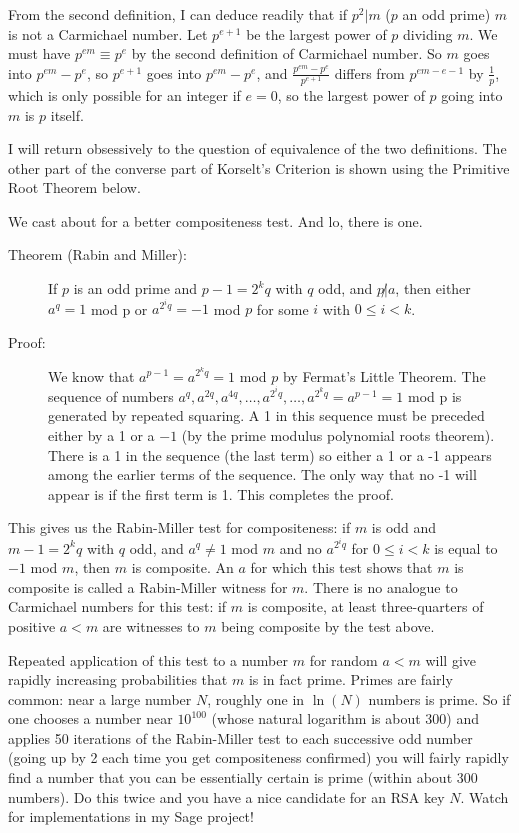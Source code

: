 \documentclass[12pt]{article}
\begin{document}
From the second definition, I can deduce readily that if $p^2 | m$ ($p$ an odd prime) $m$ is not a Carmichael number.   Let $p^{e+1}$ be the largest power of $p$ dividing $m$.   We must have $p^{em} \equiv p^e$ by the
second definition of Carmichael number.  So $m$ goes into $p^{em}-p^e$, so $p^{e+1}$ goes into  $p^{em}-p^e$, and $\frac{p^{em}-p^e} {p^{e+1}}$ differs from $p^{em-e-1}$ by $\frac 1 p$, which is only possible for an 
integer if $e=0$, so the largest power of $p$ going into $m$ is $p$ itself.

I will return obsessively to the question of equivalence of the two definitions.   The other part of the converse part of Korselt's Criterion is shown using the Primitive Root Theorem below.

We cast about for a better compositeness test.  And lo, there is one.

\begin{description}

\item[Theorem (Rabin and Miller):]  If $p$ is an odd prime and $p-1=2^kq$ with $q$ odd,  and $p \not|a$,
then either $a^q=1$ mod p or $a^{2^iq}=-1$ mod $p$ for some $i$ with $0 \leq i<k$.

\item[Proof:]   We know that $a^{p-1}=a^{2^kq}=1$ mod $p$ by Fermat's Little Theorem.   The sequence of numbers $a^q, a^{2q}, a^{4q},\ldots,a^{2^iq},\ldots,a^{2^kq}=a^{p-1}=1$ mod p is generated by repeated squaring.
A 1 in this sequence must be preceded either by a 1 or a $-1$ (by the prime modulus polynomial roots theorem).   There is a 1 in the sequence (the last term) so either a 1 or a -1 appears among the earlier terms of the  sequence.  The only way that no -1 will appear is if the first term is 1.   This completes the proof.
  

\end{description}

This gives us the Rabin-Miller test for compositeness:  if $m$  is odd and $m-1=2^kq$ with $q$ odd, and $a^q \neq 1$ mod $m$ and no $a^{2^iq}$ for $0\leq i<k$ is equal to $-1$ mod $m$, then $m$ is composite.  An $a$ for which this test shows that $m$ is composite is called a Rabin-Miller witness for $m$.  There is no analogue to Carmichael numbers
for this test:  if  $m$ is composite, at least three-quarters of positive $a<m$ are witnesses to $m$ being composite by the test above.

Repeated application of this test to a number $m$  for random $a<m$ will give rapidly increasing probabilities that $m$ is in fact prime.   Primes are fairly common:  near a large number $N$, roughly one in $\ln(N)$ numbers is prime.
So if one chooses a number near $10^{100}$ (whose natural logarithm is about 300) and applies 50 iterations of the Rabin-Miller test to each successive odd number (going up by 2 each time you get compositeness confirmed) you will
fairly rapidly find a number that you can be essentially certain is prime (within about 300 numbers).   Do this twice and you have a nice candidate for an RSA key $N$.  Watch for implementations in my Sage project!
\end{document}
